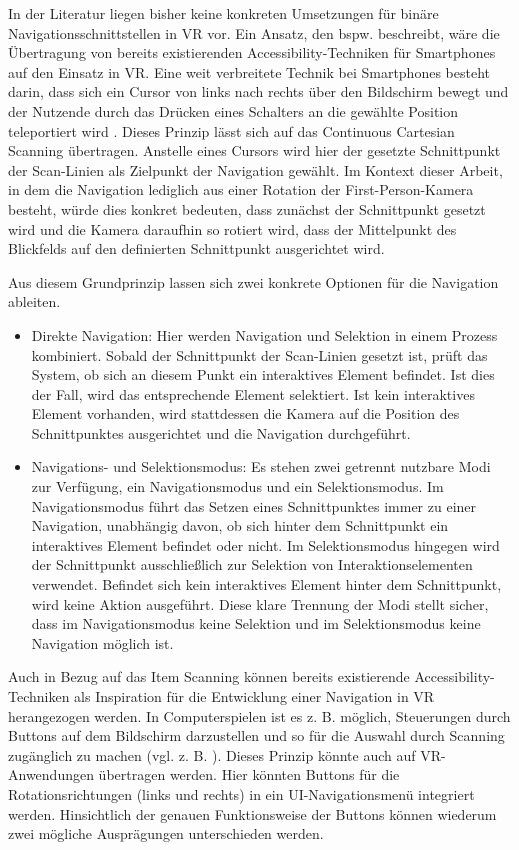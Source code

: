 In der Literatur liegen bisher keine konkreten Umsetzungen für binäre Navigationsschnittstellen in VR vor. Ein Ansatz, den bspw. \citet{wentzel_bring-your-own_2023} beschreibt, wäre die Übertragung von bereits existierenden Accessibility-Techniken für Smartphones auf den Einsatz in VR. Eine weit verbreitete Technik bei Smartphones besteht darin, dass sich ein Cursor von links nach rechts über den Bildschirm bewegt und der Nutzende durch das Drücken eines Schalters an die gewählte Position teleportiert wird \citep{wentzel_bring-your-own_2023}. Dieses Prinzip lässt sich auf das Continuous Cartesian Scanning übertragen. Anstelle eines Cursors wird hier der gesetzte Schnittpunkt der Scan-Linien als Zielpunkt der Navigation gewählt. Im Kontext dieser Arbeit, in dem die Navigation lediglich aus einer Rotation der First-Person-Kamera besteht, würde dies konkret bedeuten, dass zunächst der Schnittpunkt gesetzt wird und die Kamera daraufhin so rotiert wird, dass der Mittelpunkt des Blickfelds auf den definierten Schnittpunkt ausgerichtet wird. 

Aus diesem Grundprinzip lassen sich zwei konkrete Optionen für die Navigation ableiten.

\begin{itemize}
    \item Direkte Navigation: Hier werden Navigation und Selektion in einem Prozess kombiniert. Sobald der Schnittpunkt der Scan-Linien gesetzt ist, prüft das System, ob sich an diesem Punkt ein interaktives Element befindet. Ist dies der Fall, wird das entsprechende Element selektiert. Ist kein interaktives Element vorhanden, wird stattdessen die Kamera auf die Position des Schnittpunktes ausgerichtet und die Navigation durchgeführt.
    \item Navigations- und Selektionsmodus: Es stehen zwei getrennt nutzbare Modi zur Verfügung, ein Navigationsmodus und ein Selektionsmodus. Im Navigationsmodus führt das Setzen eines Schnittpunktes immer zu einer Navigation, unabhängig davon, ob sich hinter dem Schnittpunkt ein interaktives Element befindet oder nicht. Im Selektionsmodus hingegen wird der Schnittpunkt ausschließlich zur Selektion von Interaktionselementen verwendet. Befindet sich kein interaktives Element hinter dem Schnittpunkt, wird keine Aktion ausgeführt. Diese klare Trennung der Modi stellt sicher, dass im Navigationsmodus keine Selektion und im Selektionsmodus keine Navigation möglich ist.
\end{itemize}

Auch in Bezug auf das Item Scanning können bereits existierende Accessibility-Techniken als Inspiration für die Entwicklung einer Navigation in VR herangezogen werden. In Computerspielen ist es z. B. möglich, Steuerungen durch Buttons auf dem Bildschirm darzustellen und so für die Auswahl durch Scanning zugänglich zu machen (vgl. z. B. \citep{10.1145/2159365.2159386, trewin_exploring_2009}).  
Dieses Prinzip könnte auch auf VR-Anwendungen übertragen werden. Hier könnten Buttons für die Rotationsrichtungen (links und rechts) in ein UI-Navigationsmenü integriert werden.  Hinsichtlich der genauen Funktionsweise der Buttons können wiederum zwei mögliche Ausprägungen unterschieden werden. 


